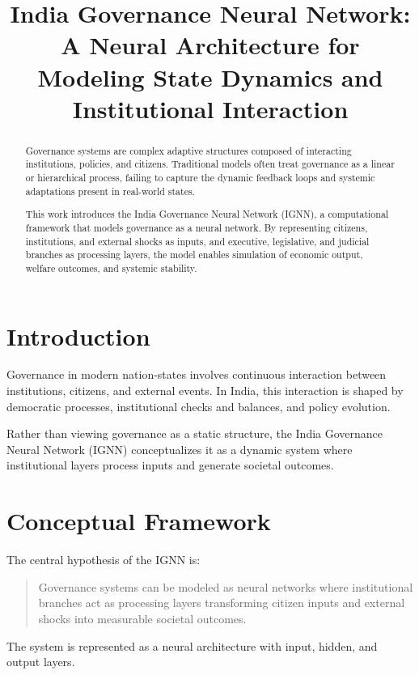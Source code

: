 \documentclass[12pt]{article}
\title{\textbf{India Governance Neural Network: \\ A Neural Architecture for Modeling State Dynamics and Institutional Interaction}}
\author{}
\date{}
\begin{document}
\maketitle

\begin{abstract}
Governance systems are complex adaptive structures composed of interacting institutions, policies, and citizens. Traditional models often treat governance as a linear or hierarchical process, failing to capture the dynamic feedback loops and systemic adaptations present in real-world states.

This work introduces the India Governance Neural Network (IGNN), a computational framework that models governance as a neural network. By representing citizens, institutions, and external shocks as inputs, and executive, legislative, and judicial branches as processing layers, the model enables simulation of economic output, welfare outcomes, and systemic stability.
\end{abstract}

\section{Introduction}

Governance in modern nation-states involves continuous interaction between institutions, citizens, and external events. In India, this interaction is shaped by democratic processes, institutional checks and balances, and policy evolution.

Rather than viewing governance as a static structure, the India Governance Neural Network (IGNN) conceptualizes it as a dynamic system where institutional layers process inputs and generate societal outcomes.

\section{Conceptual Framework}

The central hypothesis of the IGNN is:

\begin{quote}
Governance systems can be modeled as neural networks where institutional branches act as processing layers transforming citizen inputs and external shocks into measurable societal outcomes.
\end{quote}

The system is represented as a neural architecture with input, hidden, and output layers.
\end{document}
